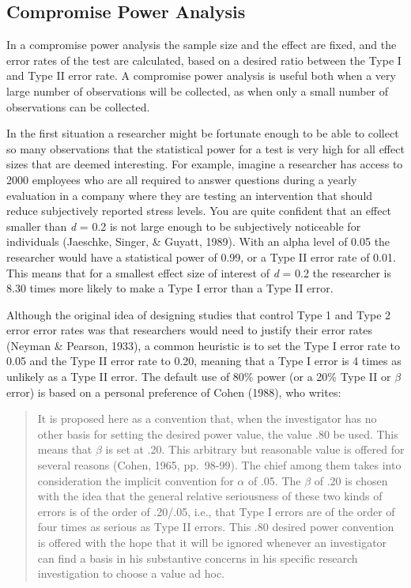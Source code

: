 \documentclass[
  english,
  ,jou, a4paper,floatsintext]{apa6}
\begin{document}
\hypertarget{compromise-power-analysis}{%
\subsection{Compromise Power Analysis}\label{compromise-power-analysis}}

In a compromise power analysis the sample size and the effect are fixed, and the error rates of the test are calculated, based on a desired ratio between the Type I and Type II error rate. A compromise power analysis is useful both when a very large number of observations will be collected, as when only a small number of observations can be collected.

In the first situation a researcher might be fortunate enough to be able to collect so many observations that the statistical power for a test is very high for all effect sizes that are deemed interesting. For example, imagine a researcher has access to 2000 employees who are all required to answer questions during a yearly evaluation in a company where they are testing an intervention that should reduce subjectively reported stress levels. You are quite confident that an effect smaller than \emph{d} = 0.2 is not large enough to be subjectively noticeable for individuals (Jaeschke, Singer, \& Guyatt, 1989). With an alpha level of 0.05 the researcher would have a statistical power of 0.99, or a Type II error rate of 0.01. This means that for a smallest effect size of interest of \emph{d} = 0.2 the researcher is 8.30 times more likely to make a Type I error than a Type II error.

Although the original idea of designing studies that control Type 1 and Type 2 error error rates was that researchers would need to justify their error rates (Neyman \& Pearson, 1933), a common heuristic is to set the Type I error rate to 0.05 and the Type II error rate to 0.20, meaning that a Type I error is 4 times as unlikely as a Type II error. The default use of 80\% power (or a 20\% Type II or \(\beta\) error) is based on a personal preference of Cohen (1988), who writes:

\begin{quote}
It is proposed here as a convention that, when the investigator has no other basis for setting the desired power value, the value .80 be used. This means that \(\beta\) is set at .20. This arbitrary but reasonable value is offered for several reasons (Cohen, 1965, pp.~98-99). The chief among them takes into consideration the implicit convention for \(\alpha\) of .05. The \(\beta\) of .20 is chosen with the idea that the general relative seriousness of these two kinds of errors is of the order of .20/.05, i.e., that Type I errors are of the order of four times as serious as Type II errors. This .80 desired power convention is offered with the hope that it will be ignored whenever an investigator can find a basis in his substantive concerns in his specific research investigation to choose a value ad hoc.
\end{quote}
\end{document}
